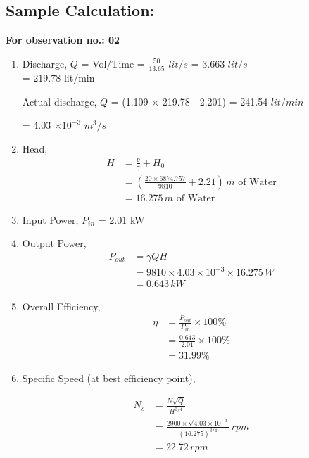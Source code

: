 \documentclass[12pt]{article}
\begin{document}
\subsection*{Sample Calculation:}
\textbf{For observation no.: 02}
\begin{enumerate}
  \item Discharge, $Q$ = Vol/Time = $\frac{50}{13.65}$ $lit/s$ = 3.663 $lit/s$ \\
  
  \hspace*{0.25\linewidth} = 219.78 lit/min 
  
  Actual discharge, $Q$ = (1.109 $\times$ 219.78 - 2.201) = 241.54 $lit/min$
  
  \hspace*{0.20\linewidth} = 4.03 $\times 10^{-3}$ $m^3/s$ 

  \item Head, 
  \begin{align*}
    H &= \frac{p}{\gamma} + H_0 \\
    &= \left(\frac{20 \times 6874.757}{9810} + 2.21 \right) \, m \text{ of Water}\\
    &= 16.275 \, m \text{ of Water}
  \end{align*}
  
  \item Input Power, $P_{in}$ = 2.01 kW 
  \item Output Power,
  \begin{align*}
    P_{out} &= \gamma Q H \\
    &=  9810 \times 4.03\times 10^{-3} \times 16.275 \, W \\
    &= 0.643 \, kW
  \end{align*}
  \item Overall Efficiency, 
  \begin{align*}
    \eta &= \frac{P_{out}}{P_{in}} \times 100\% \\
    &=\frac{0.643}{2.01} \times 100\%\\
    &=31.99\%
  \end{align*}
  
  \item Specific Speed (at best efficiency point), 
  
  \begin{align*}
    N_s &= \frac{N \sqrt{Q}}{H^{3/4}} \\
    &= \frac{2900 \times \sqrt{4.03\times 10^{-3}}}{(16.275)^{3/4}} \, rpm \\
    &= 22.72 \, rpm 
  \end{align*}
\end{enumerate}
\end{document}
